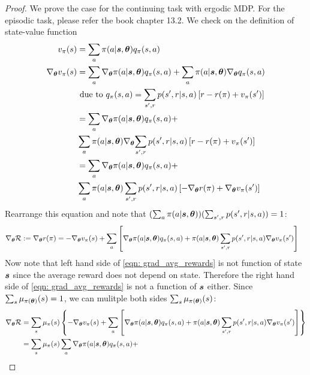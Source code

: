 \documentclass[11pt]{article}
\begin{document}
\begin{proof} We prove the case for the continuing task with ergodic MDP. For the episodic task, please refer the book \citep{sutton2018reinforcement} chapter 13.2. We check on the definition of state-value function 
\begin{align*}
v_{\pi}(s) &= \sum_{a}\pi(a|\boldsymbol{s}, \boldsymbol{\theta})q_{\pi}(s, a) \\
\nabla_{\boldsymbol{\theta}}{v_{\pi}(s) } &= \sum_{a}\nabla_{\boldsymbol{\theta}}{\pi(a|\boldsymbol{s}, \boldsymbol{\theta})}q_{\pi}(s, a)  +  \sum_{a}\pi(a|\boldsymbol{s}, \boldsymbol{\theta})\nabla_{\boldsymbol{\theta}}{q_{\pi}(s, a)} \\
&\text{ due to }q_{\pi}(s, a) = \sum_{s', r}p(s', r| s, a)\left[r- r(\pi) + v_{\pi}(s')\right]\\
&=  \sum_{a}\nabla_{\boldsymbol{\theta}}{\pi(a|\boldsymbol{s}, \boldsymbol{\theta})}q_{\pi}(s, a) +  \\
& \sum_{a}\pi(a|\boldsymbol{s}, \boldsymbol{\theta})\nabla_{\boldsymbol{\theta}}{\sum_{s', r}p(s', r| s, a)\left[r- r(\pi) + v_{\pi}(s')\right]}\\
&=  \sum_{a}\nabla_{\boldsymbol{\theta}}{\pi(a|\boldsymbol{s}, \boldsymbol{\theta})}q_{\pi}(s, a)  + \\
& \sum_{a}\pi(a|\boldsymbol{s}, \boldsymbol{\theta})\sum_{s', r}p(s', r| s, a)\left[- \nabla_{\boldsymbol{\theta}}{r(\pi)} + \nabla_{\boldsymbol{\theta}}{v_{\pi}(s')}\right] 
\end{align*} Rearrange this equation and note that $(\sum_{a}\pi(a|\boldsymbol{s}, \boldsymbol{\theta}))(\sum_{s', r}p(s', r| s, a)) = 1$:
\begin{align}
\nabla_{\boldsymbol{\theta}}{{\mathcal R}}:=\nabla_{\boldsymbol{\theta}}{r(\pi)}&= -\nabla_{\boldsymbol{\theta}}{v_{\pi}(s)} + \sum_{a}\left[\nabla_{\boldsymbol{\theta}}{\pi(a|\boldsymbol{s}, \boldsymbol{\theta})}q_{\pi}(s, a)  + \pi(a|\boldsymbol{s}, \boldsymbol{\theta})\sum_{s', r}p(s', r| s, a) \nabla_{\boldsymbol{\theta}}{v_{\pi}(s')}\right] \label{eqn: grad_avg_rewards}
\end{align} Now note that  left hand side of \eqref{eqn: grad_avg_rewards} is not function of state $\boldsymbol{s}$ since the average reward does not depend on state. Therefore the right hand side of \eqref{eqn: grad_avg_rewards} is not a function of  $\boldsymbol{s}$ either. Since $\sum_{s}\mu_{\pi(\boldsymbol{\theta})}(s) = 1$, we can mulitple both sides $\sum_{s}\mu_{\pi(\boldsymbol{\theta})}(s)$:
\begin{align*}
\grad{\mb{\theta}}{\cR} &= \sum_{s}\mu_{\pi}(s)\set{ -\grad{\mb{\theta}}{v_{\pi}(s)} + \sum_{a}\brac{\grad{\mb{\theta}}{\pi(a|\mb{s}, \mb{\theta})}q_{\pi}(s, a)  + \pi(a|\mb{s}, \mb{\theta})\sum_{s', r}p(s', r| s, a) \grad{\mb{\theta}}{v_{\pi}(s')}}} \\
&=  \sum_{s}\mu_{\pi}(s)\sum_{a}\grad{\mb{\theta}}{\pi(a|\mb{s}, \mb{\theta})}q_{\pi}(s, a) +

\end{align*}
\end{proof}
\end{document}
